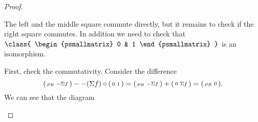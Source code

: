 \begin{proof}
\begin{enumerate}[label={(\bfseries TR\arabic*)}]
{\begin{center}
            \end{center}
            The left and the middle square commute directly, but it remains to check if the right square commutes. In addition we need to check that \( \class{
                \begin{psmallmatrix}
                    0 & 1
                \end{psmallmatrix}
            } \) is an isomorphism.

            First, check the commutativity. Consider the difference
            \[
                \begin{psmallmatrix}
                    \rho_B & -\Sigma f
                \end{psmallmatrix}
                -
                -(\Sigma f) \circ
                \begin{psmallmatrix}
                    0 & 1
                \end{psmallmatrix}
                =
                \begin{psmallmatrix}
                    \rho_B & -\Sigma f
                \end{psmallmatrix}
                +
                \begin{psmallmatrix}
                    0 & \Sigma f
                \end{psmallmatrix}
                =
                \begin{psmallmatrix}
                    \rho_B & 0
                \end{psmallmatrix}.
            \]
            We can see that the diagram
            \begin{center}
\end{center}}
\end{enumerate}
\end{proof}
